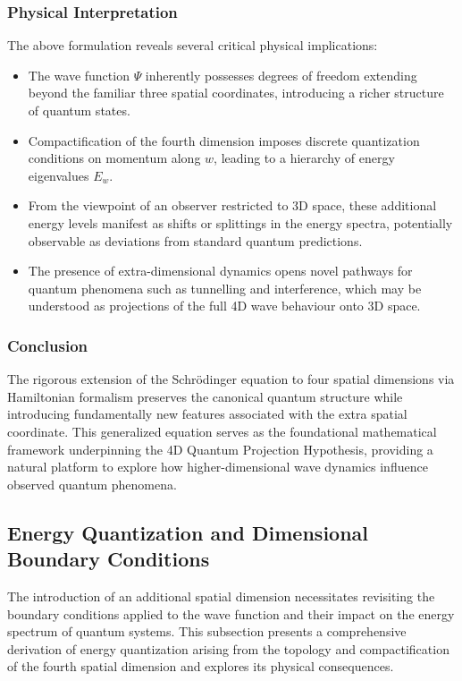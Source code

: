\documentclass[12pt]{article}
\begin{document}
\subsubsection*{Physical Interpretation}

The above formulation reveals several critical physical implications:

\begin{itemize}
    \item The wave function \(\Psi\) inherently possesses degrees of freedom extending beyond the familiar three spatial coordinates, introducing a richer structure of quantum states.
    \item Compactification of the fourth dimension imposes discrete quantization conditions on momentum along \(w\), leading to a hierarchy of energy eigenvalues \(E_w\).
    \item From the viewpoint of an observer restricted to 3D space, these additional energy levels manifest as shifts or splittings in the energy spectra, potentially observable as deviations from standard quantum predictions.
    \item The presence of extra-dimensional dynamics opens novel pathways for quantum phenomena such as tunnelling and interference, which may be understood as projections of the full 4D wave behaviour onto 3D space.
\end{itemize}

\subsubsection*{Conclusion}

The rigorous extension of the Schrödinger equation to four spatial dimensions via Hamiltonian formalism preserves the canonical quantum structure while introducing fundamentally new features associated with the extra spatial coordinate. This generalized equation serves as the foundational mathematical framework underpinning the 4D Quantum Projection Hypothesis, providing a natural platform to explore how higher-dimensional wave dynamics influence observed quantum phenomena.


\subsection{Energy Quantization and Dimensional Boundary Conditions}

The introduction of an additional spatial dimension necessitates revisiting the boundary conditions applied to the wave function and their impact on the energy spectrum of quantum systems. This subsection presents a comprehensive derivation of energy quantization arising from the topology and compactification of the fourth spatial dimension and explores its physical consequences.
\end{document}
